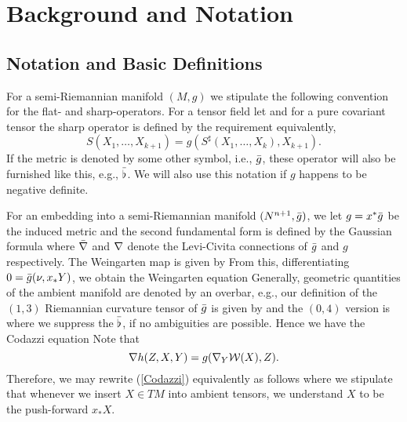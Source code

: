 \section{Background and Notation}
\subsection{Notation and Basic Definitions}
\label{subsec:bg_notation}
For a semi-Riemannian manifold $(M,g)$ we stipulate the following convention for the flat- and sharp-operators. For a tensor field
let
 and for a pure covariant tensor the sharp operator is defined by the requirement
equivalently,
\[S(X_{1},\dots, X_{k+1})=g(S^{\sharp}(X_{1},\dots, X_{k}),X_{k+1}).\]
If the metric is denoted by some other symbol, i.e., $\-g$, these operator will also be furnished like this, e.g., $\-\flat$. We will also use this notation if $g$ happens to be negative definite.

For an embedding into a semi-Riemannian manifold $(N^{n+1},\-g)$,
we let $g=x^{*}\-g$ be the induced metric and the second fundamental form is defined by the Gaussian formula
where $\-\n$ and $\n$ denote the Levi-Civita connections of $\-g$ and $g$ respectively. The Weingarten map is given by
From this, differentiating $0=\-g(\nu,{x_{*}Y})$, we obtain the Weingarten equation
Generally, geometric quantities of the ambient manifold are denoted by an overbar, e.g., our definition of the $(1,3)$ Riemannian curvature tensor of $\-g$ is given by
and the $(0,4)$ version is
where we suppress the $\-\flat$, if no ambiguities are possible.
Hence we have the Codazzi equation
Note that
\[\nabla h (Z,X,Y)=g(\nabla_Y \mc{W}(X),Z).\]
Therefore, we may rewrite (\ref{Codazzi}) equivalently as follows
where we stipulate that whenever we insert $X\in  T M$ into ambient tensors, we understand $X$ to be the push-forward $x_{*}X.$

